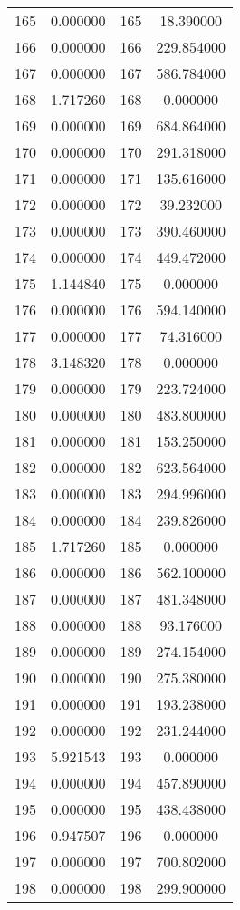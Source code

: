 \documentclass[12pt]{article}
\begin{document}
\begin{longtable}{@{}cccc@{}}
165 & 0.000000 & 165 & 18.390000 \\
166 & 0.000000 & 166 & 229.854000 \\
167 & 0.000000 & 167 & 586.784000 \\
168 & 1.717260 & 168 & 0.000000 \\
169 & 0.000000 & 169 & 684.864000 \\
170 & 0.000000 & 170 & 291.318000 \\
171 & 0.000000 & 171 & 135.616000 \\
172 & 0.000000 & 172 & 39.232000 \\
173 & 0.000000 & 173 & 390.460000 \\
174 & 0.000000 & 174 & 449.472000 \\
175 & 1.144840 & 175 & 0.000000 \\
176 & 0.000000 & 176 & 594.140000 \\
177 & 0.000000 & 177 & 74.316000 \\
178 & 3.148320 & 178 & 0.000000 \\
179 & 0.000000 & 179 & 223.724000 \\
180 & 0.000000 & 180 & 483.800000 \\
181 & 0.000000 & 181 & 153.250000 \\
182 & 0.000000 & 182 & 623.564000 \\
183 & 0.000000 & 183 & 294.996000 \\
184 & 0.000000 & 184 & 239.826000 \\
185 & 1.717260 & 185 & 0.000000 \\
186 & 0.000000 & 186 & 562.100000 \\
187 & 0.000000 & 187 & 481.348000 \\
188 & 0.000000 & 188 & 93.176000 \\
189 & 0.000000 & 189 & 274.154000 \\
190 & 0.000000 & 190 & 275.380000 \\
191 & 0.000000 & 191 & 193.238000 \\
192 & 0.000000 & 192 & 231.244000 \\
193 & 5.921543 & 193 & 0.000000 \\
194 & 0.000000 & 194 & 457.890000 \\
195 & 0.000000 & 195 & 438.438000 \\
196 & 0.947507 & 196 & 0.000000 \\
197 & 0.000000 & 197 & 700.802000 \\
198 & 0.000000 & 198 & 299.900000 \\

\end{longtable}
\end{document}
